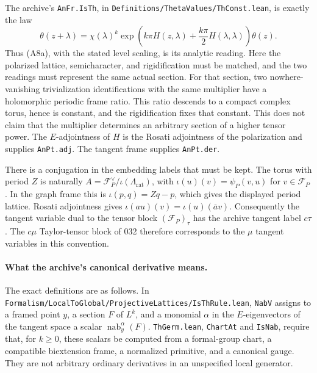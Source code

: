 The archive's \texttt{AnFr.IsTh}, in
\texttt{Definitions/ThetaValues/ThConst.lean}, is exactly the law
\[
 \theta(z+\lambda)
   =\chi(\lambda)^k
       \exp\left(k\pi H(z,\lambda)
                +\frac{k\pi}{2}H(\lambda,\lambda)\right)\theta(z).
\]
Thus (A8a), with the stated level scaling, is its analytic reading.
Here the polarized lattice, semicharacter, and rigidification must
be matched, and the two readings must represent the same actual
section.  For that section, two nowhere-vanishing trivialization
identifications with the same multiplier have a holomorphic
periodic frame ratio.  This ratio descends to a compact complex
torus, hence is constant, and the rigidification fixes that
constant.  This does not claim that the multiplier determines an
arbitrary section of a higher tensor power.  The $E$-adjointness of
$H$ is the Rosati adjointness of
the polarization and supplies \texttt{AnPt.adj}.  The tangent
frame supplies \texttt{AnPt.der}.

There is a conjugation in the embedding labels that must be kept.
The torus with period $Z$ is naturally
$A=\mathcal F_P^\vee/\iota(\Lambda_{\mathrm{rat}})$, with
$\iota(u)(v)=\psi_P(v,u)$ for $v\in\mathcal F_P$.
In the graph frame this is $\iota(p,q)=Zq-p$, which gives the
displayed period lattice.  Rosati adjointness gives
$\iota(au)(v)=\iota(u)(\overline a v)$.
Consequently the tangent variable dual to the tensor block
$(\mathcal F_P)_\tau$ has the archive tangent label $c\tau$.
The $c\mu$ Taylor-tensor block of 032 therefore corresponds to
the $\mu$ tangent variables in this convention.

\paragraph{What the archive's canonical derivative means.}
The exact definitions are as follows.  In
\texttt{Formalism/LocalToGlobal/ProjectiveLattices/IsThRule.lean},
\texttt{NabV} assigns to a framed point $y$, a section $F$ of
$L^k$, and a monomial $\alpha$ in the $E$-eigenvectors of the
tangent space a scalar $\operatorname{nab}_y^\alpha(F)$.
\texttt{ThGerm.lean}, \texttt{ChartAt} and \texttt{IsNab}, require
that, for $k\geq0$, these scalars be computed from a formal-group
chart, a compatible biextension frame, a normalized primitive,
and a canonical gauge.  They are not arbitrary ordinary
derivatives in an unspecified local generator.

